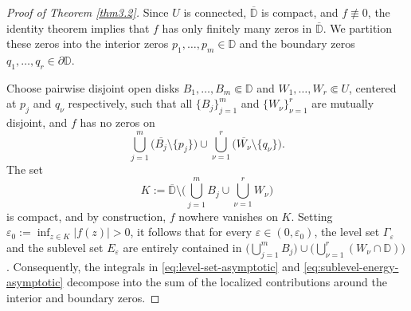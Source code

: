 \documentclass[12pt,twoside]{amsart}
\numberwithin{equation}{section}
\numberwithin{definition}{section} %
\begin{document}
\begin{proof}[Proof of Theorem \ref{thm3.2}]
Since $U$ is connected, $\overline{\mathbb{D}}$ is compact, and $f \not\equiv 0$, the identity theorem implies that $f$ has only finitely many zeros in $\overline{\mathbb{D}}$. We partition these zeros into the interior zeros $p_1, \dots, p_m \in \mathbb{D}$ and the boundary zeros $q_1, \dots, q_r \in \partial\mathbb{D}$.

Choose pairwise disjoint open disks $B_1, \dots, B_m \Subset \mathbb{D}$ and $W_1, \dots, W_r \Subset U$, centered at $p_j$ and $q_\nu$ respectively, such that all $\{B_j\}_{j=1}^m$ and $\{W_\nu\}_{\nu=1}^r$ are mutually disjoint, and $f$ has no zeros on$$\bigcup_{j=1}^m \bigl(\overline{B_j} \setminus \{p_j\}\bigr) \cup \bigcup_{\nu=1}^r \bigl(\overline{W_\nu} \setminus \{q_\nu\}\bigr).$$The set$$K := \overline{\mathbb{D}} \setminus \Biggl( \bigcup_{j=1}^m B_j \cup \bigcup_{\nu=1}^r W_\nu \Biggr)$$is compact, and by construction, $f$ nowhere vanishes on $K$. Setting $\varepsilon_0 := \inf_{z \in K} \vert{}f(z)\vert{} > 0$, it follows that for every $\varepsilon \in (0, \varepsilon_0)$, the level set $\Gamma_\varepsilon$ and the sublevel set $E_\varepsilon$ are entirely contained in $\bigl(\bigcup_{j=1}^m B_j\bigr) \cup \bigl(\bigcup_{\nu=1}^r (W_\nu \cap \mathbb{D})\bigr)$. Consequently, the integrals in \eqref{eq:level-set-asymptotic} and \eqref{eq:sublevel-energy-asymptotic} decompose into the sum of the localized contributions around the interior and boundary zeros.






\end{proof}
\end{document}
